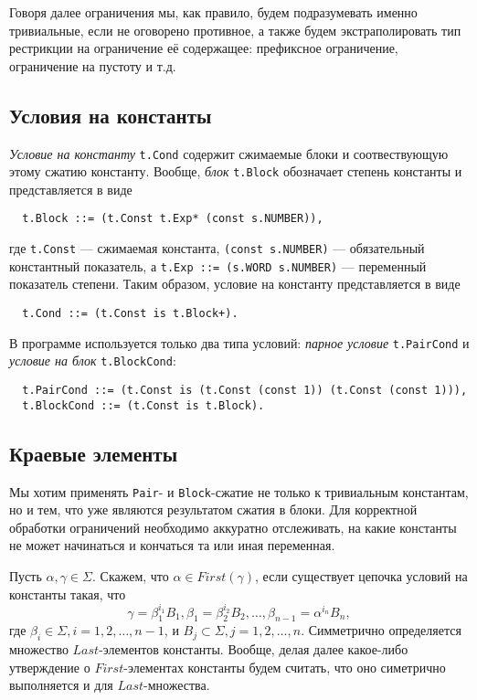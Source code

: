 \documentclass[12pt]{article}
\begin{document}
Говоря далее ограничения мы, как правило, будем подразумевать именно
тривиальные, если не оговорено противное, а также будем экстраполировать
тип рестрикции на ограничение её содержащее: префиксное ограничение,
ограничение на пустоту и т.д.

\subsection{Условия на константы}

\textit{Условие на константу} \texttt{t.Cond} содержит сжимаемые блоки и
соотвествующую этому сжатию константу. Вообще, \textit{блок} \texttt{t.Block}
обозначает степень константы и представляется в виде
\begin{Verbatim}
  t.Block ::= (t.Const t.Exp* (const s.NUMBER)),
\end{Verbatim}
где \texttt{t.Const} --- сжимаемая константа, \texttt{(const s.NUMBER)} ---
обязательный константный показатель, а \texttt{t.Exp ::= (s.WORD s.NUMBER)}
--- переменный показатель степени. Таким образом, условие на константу
представляется в виде
\begin{Verbatim}
  t.Cond ::= (t.Const is t.Block+).
\end{Verbatim}
В программе используется только два типа условий: \textit{парное условие}
\texttt{t.PairCond} и \textit{условие на блок} \texttt{t.BlockCond}:
\begin{Verbatim}
  t.PairCond ::= (t.Const is (t.Const (const 1)) (t.Const (const 1))),
  t.BlockCond ::= (t.Const is t.Block).
\end{Verbatim}

\subsection{Краевые элементы}

Мы хотим применять \texttt{Pair}- и \texttt{Block}-сжатие не только к
тривиальным константам, но и тем, что уже являются результатом сжатия в блоки.
Для корректной обработки ограничений необходимо аккуратно отслеживать, на какие
константы не может начинаться и кончаться та или иная переменная.

Пусть $\alpha, \gamma \in \Sigma$. Скажем, что $\alpha \in First(\gamma)$, если
существует цепочка условий на константы такая, что
\begin{displaymath}
  \gamma = \beta_1^{i_1} B_1,
  \beta_1 = \beta_2^{i_2} B_2,
  \dots,
  \beta_{n-1} = \alpha^{i_n} B_n,
\end{displaymath}
где $\beta_i \in \Sigma, i = 1, 2, \dots, n - 1$, и $B_j \subset \Sigma, j = 1,
2, \dots, n$. Симметрично определяется множество $Last$-элементов константы.
Вообще, делая далее какое-либо утверждение о $First$-элементах константы будем
считать, что оно симетрично выполняется и для $Last$-множества.
\end{document}
